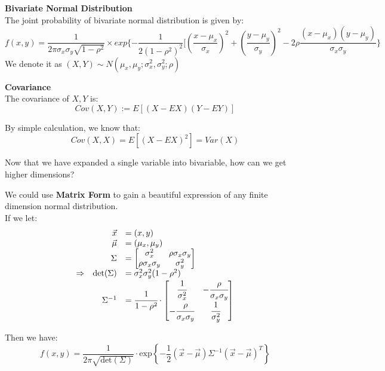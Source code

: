 \documentclass{article}
\begin{document}
\begin{definition}
    \textbf{Bivariate Normal Distribution}\\
    The joint probability of bivariate normal distribution is given by:
    $$ f(x,y) = \frac{1}{2\pi \sigma_x\sigma_y\sqrt{1-\rho^2}} \times exp\{-\frac{1}{2(1-\rho^2)^2}[(\frac{x-\mu_x}{\sigma_x})^2 + (\frac{y - \mu_y}{\sigma_y})^2 - 2\rho\frac{(x - \mu_x)(y - \mu_y)}{\sigma_x\sigma_y}\}$$
    We denote it as $(X,Y) \sim N(\mu_x,\mu_y; \sigma^2_x,\sigma^2_y;\rho)$
\end{definition}

\begin{definition}
    \textbf{Covariance}\\
    The covariance of $X,Y$ is:
    $$ Cov(X,Y) := E[(X - EX)(Y - EY)]$$
\end{definition}
By simple calculation, we know that:
$$ Cov(X,X) = E[(X-EX)^2] = Var(X)$$

Now that we have expanded a single variable into bivariable, how can we get higher dimensions?

We could use \textbf{Matrix Form} to gain a beautiful expression of any finite dimension normal distribution.\\
If we let:
\begingroup
\renewcommand{\arraystretch}{1.5}
\[
\begin{array}{lrl}
            & \vec{x} &= (x,y)\\
            & \vec{\mu} &= (\mu_{x}, \mu_{y})\\
            & \Sigma &= 
                    \begin{bmatrix}
                        \sigma_{x}^{2} & \rho \sigma_{x}\sigma_{y} \\
                        \rho \sigma_{x}\sigma_{y} & \sigma_{y}^{2}
                    \end{bmatrix}\\
\Rightarrow & \text{det}(\Sigma) &= \sigma_{x}^{2} \sigma_{y}^{2} (1-\rho^{2})\\
            & \Sigma^{-1} &= \cfrac{1}{1-\rho^{2}} \cdot
                    \begin{bmatrix}
                        \cfrac{1}{\sigma_{x}^{2}} & - \cfrac{\rho}{\sigma_{x} \sigma_{y}}\\
                        - \cfrac{\rho}{\sigma_{x} \sigma_{y}} & \cfrac{1}{\sigma_{y}^{2}}
                    \end{bmatrix}
\end{array}
\]
\endgroup

Then we have:
\[
f(x,y) = \frac{1}{2\pi \sqrt{\text{det}(\Sigma)}} \cdot \text{exp} \left\{ -\frac{1}{2} (\vec{x} - \vec{\mu}) \Sigma^{-1} (\vec{x} - \vec{\mu})^{T}  \right\}
\]
\end{document}
